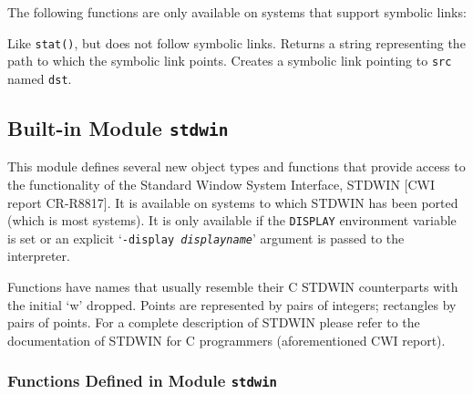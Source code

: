 The following functions are only available on systems that support
symbolic links:
\begin{description}
Like
{\tt stat()},
but does not follow symbolic links.
Returns a string representing the path to which the symbolic link
points.
Creates a symbolic link pointing to
{\tt src}
named
{\tt dst}.
\end{description}

\subsection{Built-in Module {\tt stdwin}}

This module defines several new object types and functions that
provide access to the functionality of the Standard Window System
Interface, STDWIN [CWI report CR-R8817].
It is available on systems to which STDWIN has been ported (which is
most systems).
It is only available if the {\tt DISPLAY} environment variable is set
or an explicit `{\tt -display \it displayname}' argument is passed to
the interpreter.

Functions have names that usually resemble their C STDWIN counterparts
with the initial `w' dropped.
Points are represented by pairs of integers; rectangles
by pairs of points.
For a complete description of STDWIN please refer to the documentation
of STDWIN for C programmers (aforementioned CWI report).
\subsubsection{Functions Defined in Module {\tt stdwin}}

